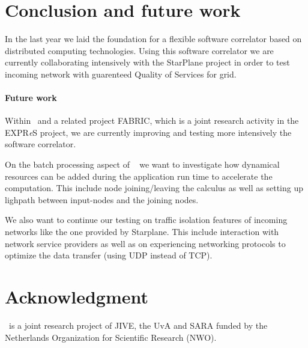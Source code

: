 \section{Conclusion and future work}
In the last year we laid the foundation for a flexible software
correlator based on distributed computing technologies.  Using this
software correlator we are currently collaborating intensively with
the StarPlane project in order to test incoming network with
guarenteed Quality of Services for grid.

\paragraph{Future work}
Within \scarie\ and a related project FABRIC, which is a joint
research activity in the EXPR{\it e}S project, we are currently
improving and testing more intensively the software correlator. 

On the batch processing aspect of \scarie~ we want to investigate 
how dynamical resources can be added during the application run time to 
accelerate the computation. This include node joining/leaving the calculus as well as
setting up lighpath between input-nodes and the joining nodes.

We also want to continue our testing on traffic isolation features of
incoming networks like the one provided by Starplane. This include
interaction with network service providers as well as on experiencing
networking protocols to optimize the data transfer (using UDP instead
of TCP).

\section{Acknowledgment}
\scarie\ is a joint research project of JIVE, the UvA and SARA funded
by the Netherlands Organization for Scientific Research (NWO).


